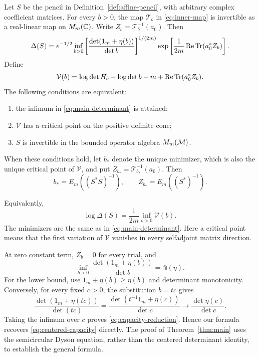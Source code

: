 \begin{theorem}\label{thm:main}
Let $S$ be the pencil in Definition~\ref{def:affine-pencil}, with arbitrary complex coefficient matrices.
For every $b>0$, the map $\mathcal T_b$ in \eqref{eq:inner-map} is invertible as a real-linear map on $M_m(\mathbb C)$.
Write $Z_b=\mathcal T_b^{-1}(a_0)$.
Then
\begin{equation}\label{eq:main-determinant}
 \Delta(S)=e^{-1/2}\inf_{b>0}
 \left[\frac{\det(1_m+\eta(b))}{\det b}\right]^{1/(2m)}
 \exp\left[\frac1{2m}\operatorname{Re}\operatorname{Tr}(a_0^*Z_b)\right].
\end{equation}
Define
\begin{equation}\label{eq:main-action}
 \mathcal V(b)=\log\det H_b-\log\det b-m
                 +\operatorname{Re}\operatorname{Tr}(a_0^*Z_b).
\end{equation}
The following conditions are equivalent:
\begin{enumerate}
\renewcommand{\labelenumi}{(\roman{enumi})}
\item the infimum in \eqref{eq:main-determinant} is attained;
\item $\mathcal V$ has a critical point on the positive definite cone;
\item $S$ is invertible in the bounded operator algebra $M_m(\mathcal M)$.
\end{enumerate}
When these conditions hold, let $b_*$ denote the unique minimizer, which is also the unique critical point of $\mathcal V$, and put $Z_{b_*}=\mathcal T_{b_*}^{-1}(a_0)$.
Then
\begin{equation}\label{eq:main-optimizer}
 b_*=E_m((S^*S)^{-1}),\qquad Z_{b_*}=E_m((S^*)^{-1}).
\end{equation}
\end{theorem}

Equivalently,
\[
 \log\Delta(S)=\frac1{2m}\inf_{b>0}\mathcal V(b).
\]
The minimizers are the same as in \eqref{eq:main-determinant}.
Here a critical point means that the first variation of $\mathcal V$ vanishes in every selfadjoint matrix direction.

At zero constant term, $Z_b=0$ for every trial, and
\begin{equation}\label{eq:capacity-reduction}
 \inf_{b>0}\frac{\det(1_m+\eta(b))}{\det b}=\Cap(\eta).
\end{equation}
For the lower bound, use $1_m+\eta(b)\ge\eta(b)$ and determinant monotonicity.
Conversely, for every fixed $c>0$, the substitution $b=tc$ gives
\[
 \frac{\det(1_m+\eta(tc))}{\det(tc)}
   =\frac{\det(t^{-1}1_m+\eta(c))}{\det c}
   \longrightarrow\frac{\det\eta(c)}{\det c}.
\]
Taking the infimum over $c$ proves \eqref{eq:capacity-reduction}.
Hence our formula recovers \eqref{eq:centered-capacity} directly.
The proof of Theorem~\ref{thm:main} uses the semicircular Dyson equation, rather than the centered determinant identity, to establish the general formula.

